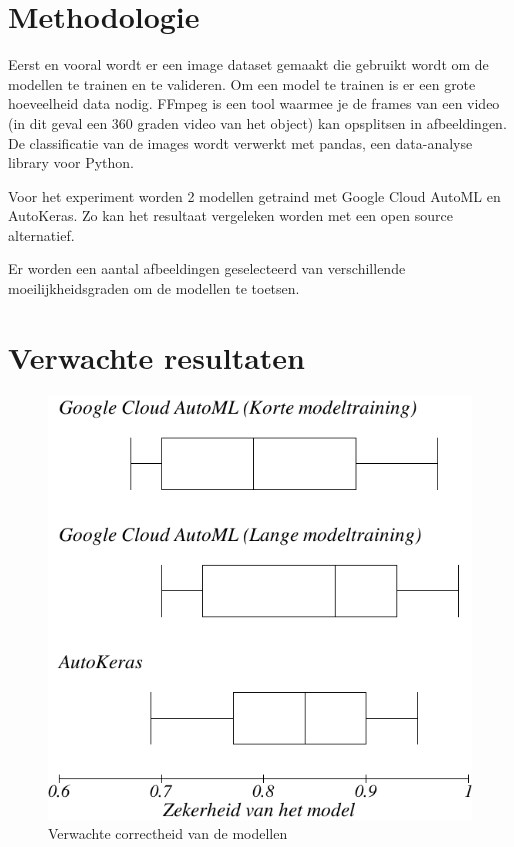 \section{Methodologie}
\label{sec:methodologie}

Eerst en vooral wordt er een image dataset gemaakt die gebruikt wordt om de modellen te trainen en te valideren. Om een model te trainen is er een grote hoeveelheid data nodig. FFmpeg is een tool waarmee je de frames van een video (in dit geval een 360 graden video van het object) kan opsplitsen in afbeeldingen. De classificatie van de images wordt verwerkt met pandas, een data-analyse library voor Python.

Voor het experiment worden 2 modellen getraind met Google Cloud AutoML en AutoKeras. Zo kan het resultaat vergeleken worden met een open source alternatief. 

Er worden een aantal afbeeldingen geselecteerd van verschillende moeilijkheidsgraden om de modellen te toetsen.

\section{Verwachte resultaten}
\label{sec:verwachte_resultaten}

\begin{figure}
    \includegraphics[width=\linewidth]{img/boxplot.png}
    \vspace{1mm}
    \caption{Verwachte correctheid van de modellen}
    \label{fig:boxplot1}
\end{figure}

